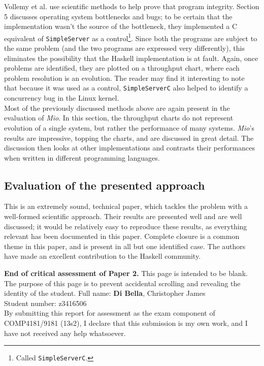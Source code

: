 \documentclass[9pt]{report}
\begin{document}
\noindent
Vollemy et al. use scientific methods to help prove that program integrity.
Section 5 discusses operating system bottlenecks and bugs; to be certain that the implementation wasn't the source of the bottleneck, they implemented a C equivalent of \verb/SimpleServer/ as a control\footnote{Called \texttt{SimpleServerC}.}.
Since both the programs are subject to the same problem (and the two programs are expressed very differently), this eliminates the possibility that the Haskell implementation is at fault.
Again, once problems are identified, they are plotted on a throughput chart, where each problem resolution is an evolution.
The reader may find it interesting to note that because it was used as a control, \verb/SimpleServerC/ also helped to identify a concurrency bug in the Linux kernel.\\

\noindent
Most of the previously discussed methods above are again present in the evaluation of {\it Mio}.
In this section, the throughput charts do not represent evolution of a single system, but rather the performance of many systems.
{\it Mio}'s results are impressive, topping the charts, and are discussed in great detail.
The discussion then looks at other implementations and contrasts their performances when written in different programming languages.

\subsection*{Evaluation of the presented approach}
This is an extremely sound, technical paper, which tackles the problem with a well-formed scientific approach.
Their results are presented well and are well discussed; it would be relatively easy to reproduce these results, as everything relevant has been documented in this paper.
Complete closure is a common theme in this paper, and is present in all but one identified case.
The authors have made an excellent contribution to the Haskell community.

\noindent
{\bf End of critical assessment of Paper 2.}
\clearpage
\noindent
This page is intended to be blank.\\

\noindent
The purpose of this page is to prevent accidental scrolling and revealing the identity of the student.
\clearpage
\noindent
Full name: \hspace{8mm} {\bf Di Bella}, Christopher James\\
Student number: z3416506\\

\noindent
By submitting this report for assessment as the exam component of COMP4181/9181 (13s2), I declare that this submission is my own work, and I have not received any help whatsoever.
\end{document}

